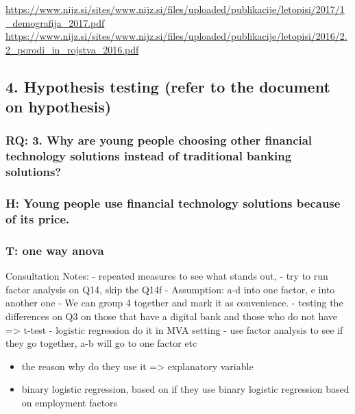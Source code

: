 \documentclass[
]{article}
\providecommand{\tightlist}{%
  \setlength{\itemsep}{0pt}\setlength{\parskip}{0pt}}
\begin{document}
\url{https://www.nijz.si/sites/www.nijz.si/files/uploaded/publikacije/letopisi/2017/1_demografija_2017.pdf}
\url{https://www.nijz.si/sites/www.nijz.si/files/uploaded/publikacije/letopisi/2016/2.2_porodi_in_rojstva_2016.pdf}

\hypertarget{hypothesis-testing-refer-to-the-document-on-hypothesis}{%
\subsection{4. Hypothesis testing (refer to the document on
hypothesis)}\label{hypothesis-testing-refer-to-the-document-on-hypothesis}}

\hypertarget{rq-3.-why-are-young-people-choosing-other-financial-technology-solutions-instead-of-traditional-banking-solutions}{%
\subsubsection{RQ: 3. Why are young people choosing other financial
technology solutions instead of traditional banking
solutions?}\label{rq-3.-why-are-young-people-choosing-other-financial-technology-solutions-instead-of-traditional-banking-solutions}}

\hypertarget{h-young-people-use-financial-technology-solutions-because-of-its-price.}{%
\subsubsection{H: Young people use financial technology solutions
because of its
price.}\label{h-young-people-use-financial-technology-solutions-because-of-its-price.}}

\hypertarget{t-one-way-anova}{%
\subsubsection{T: one way anova}\label{t-one-way-anova}}

Consultation Notes: - repeated measures to see what stands out, - try to
run factor analysis on Q14, skip the Q14f - Assumption: a-d into one
factor, e into another one - We can group 4 together and mark it as
convenience. - testing the differences on Q3 on those that have a
digital bank and those who do not have =\textgreater{} t-test - logistic
regression do it in MVA setting - use factor analysis to see if they go
together, a-b will go to one factor etc

\begin{itemize}
\tightlist
\item
  the reason why do they use it =\textgreater{} explanatory variable
\item
  binary logistic regression, based on if they use binary logistic
  regression based on employment factors
\end{itemize}
\end{document}
